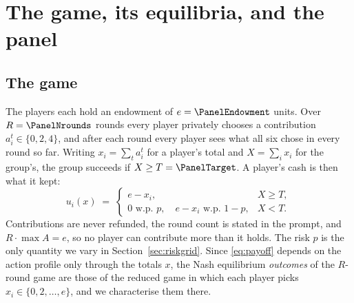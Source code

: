 
\section{The game, its equilibria, and the panel}
\label{sec:methods}

\subsection{The game}

The \PanelNplayersWord{} players each hold an endowment of $e=\PanelEndowment$ units. Over
$R=\PanelNrounds$ rounds every player privately chooses a contribution
$a_i^t\in\{0,2,4\}$, and after each round every player sees what all six chose in every
round so far. Writing $x_i=\sum_t a_i^t$ for a player's total and $X=\sum_i x_i$ for the
group's, the group succeeds if $X\ge T=\PanelTarget$. A player's cash is then what it kept:
\begin{equation}
u_i(x) \;=\;
\begin{cases}
e-x_i, & X\ge T,\\[2pt]
0 \text{ w.p.\ } p,\quad e-x_i \text{ w.p.\ } 1-p, & X<T .
\end{cases}
\label{eq:payoff}
\end{equation}
Contributions are never refunded, the round count is stated in the prompt, and
$R\cdot\max A=e$, so no player can contribute more than it holds. The risk $p$ is the only
quantity we vary in Section~\ref{sec:riskgrid}. Since \eqref{eq:payoff} depends on the
action profile only through the totals $x$, the Nash equilibrium \emph{outcomes} of the
$R$-round game are those of the reduced game in which each player picks
$x_i\in\{0,2,\dots,e\}$, and we characterise them there.

